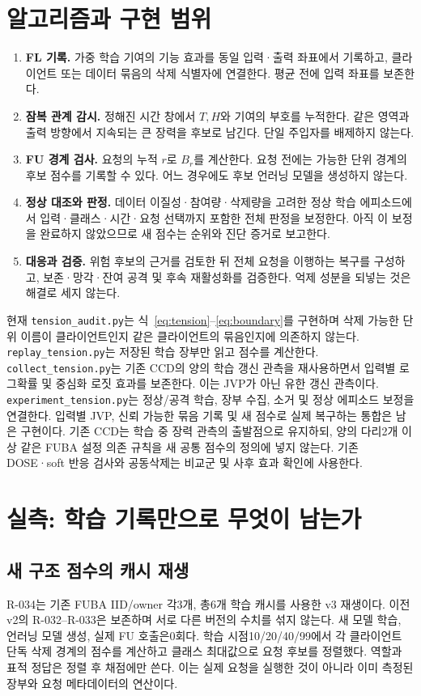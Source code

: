\documentclass[10pt,a4paper]{article}
\begin{document}
\section{알고리즘과 구현 범위}
\begin{enumerate}
\item \textbf{FL 기록.} 가중 학습 기여의 기능 효과를 동일 입력·출력 좌표에서 기록하고,
      클라이언트 또는 데이터 묶음의 삭제 식별자에 연결한다. 평균 전에 입력 좌표를 보존한다.
\item \textbf{잠복 관계 감시.} 정해진 시간 창에서 $T,H$와 기여의 부호를 누적한다.
      같은 영역과 출력 방향에서 지속되는 큰 장력을 후보로 남긴다. 단일 주입자를 배제하지 않는다.
\item \textbf{FU 경계 검사.} 요청의 누적 $r$로 $B_r$를 계산한다.
      요청 전에는 가능한 단위 경계의 후보 점수를 기록할 수 있다.
      어느 경우에도 후보 언러닝 모델을 생성하지 않는다.
\item \textbf{정상 대조와 판정.} 데이터 이질성·참여량·삭제량을 고려한 정상 학습 에피소드에서
      입력·클래스·시간·요청 선택까지 포함한 전체 판정을 보정한다.
      아직 이 보정을 완료하지 않았으므로 새 점수는 순위와 진단 증거로 보고한다.
\item \textbf{대응과 검증.} 위험 후보의 근거를 검토한 뒤 전체 요청을 이행하는 복구를 구성하고,
      보존·망각·잔여 공격 및 후속 재활성화를 검증한다. 억제 성분을 되넣는 것은 해결로 세지 않는다.
\end{enumerate}

현재 \texttt{tension\_audit.py}는 식~\eqref{eq:tension}--\eqref{eq:boundary}를 구현하며
삭제 가능한 단위 이름이 클라이언트인지 같은 클라이언트의 묶음인지에 의존하지 않는다.
\texttt{replay\_tension.py}는 저장된 학습 장부만 읽고 점수를 계산한다.
\texttt{collect\_tension.py}는 기존 CCD의 양의 학습 갱신 관측을 재사용하면서
입력별 로그확률 및 중심화 로짓 효과를 보존한다. 이는 JVP가 아닌 유한 갱신 관측이다.
\texttt{experiment\_tension.py}는 정상/공격 학습, 장부 수집, 소거 및 정상 에피소드 보정을 연결한다.
입력별 JVP, 신뢰 가능한 묶음 기록 및 새 점수로 실제 복구하는 통합은 남은 구현이다.
기존 CCD는 학습 중 장력 관측의 출발점으로 유지하되, 양의 다리2개 이상 같은 FUBA 설정 의존 규칙을
새 공통 점수의 정의에 넣지 않는다.
기존 DOSE·soft 반응 검사와 공동삭제는 비교군 및 사후 효과 확인에 사용한다.

\section{실측: 학습 기록만으로 무엇이 남는가}
\subsection{새 구조 점수의 캐시 재생}
R-034는 기존 FUBA IID/owner 각3개, 총6개 학습 캐시를 사용한 v3 재생이다.
이전 v2의 R-032--R-033은 보존하며 서로 다른 버전의 수치를 섞지 않는다.
새 모델 학습, 언러닝 모델 생성, 실제 FU 호출은0회다.
학습 시점10/20/40/99에서 각 클라이언트 단독 삭제 경계의 점수를 계산하고
클래스 최대값으로 요청 후보를 정렬했다. 역할과 표적 정답은 정렬 후 채점에만 쓴다.
이는 실제 요청을 실행한 것이 아니라 이미 측정된 장부와 요청 메타데이터의 연산이다.
\end{document}
